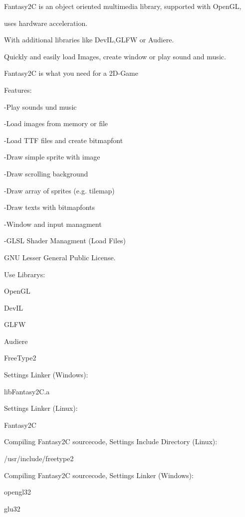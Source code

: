  Fantasy2C is an object oriented multimedia library, supported with OpenGL, \par
 uses hardware acceleration. \par
 With additional libraries like DevIL,GLFW or Audiere. \par
 Quickly and easily load Images, create window or play sound and music. \par
 Fantasy2C is what you need for a 2D-\/Game \par
 \par
 Features: \par
 -\/Play sounds und music\par
 -\/Load images from memory or file\par
 -\/Load TTF files and create bitmapfont\par
 -\/Draw simple sprite with image\par
 -\/Draw scrolling background\par
 -\/Draw array of sprites (e.g. tilemap)\par
 -\/Draw texts with bitmapfonts\par
 -\/Window and input managment\par
 -\/GLSL Shader Managment (Load Files)\par
 \par
 GNU Lesser General Public License. \par
 \par
 Use Librarys: \par
 OpenGL \par
 DevIL \par
 GLFW \par
 Audiere \par
 FreeType2 \par
 \par
 Settings Linker (Windows): \par
 libFantasy2C.a \par
 \par
 Settings Linker (Linux): \par
 Fantasy2C \par
 \par
 Compiling Fantasy2C sourcecode, Settings Include Directory (Linux): \par
 /usr/include/freetype2 \par
 \par
 Compiling Fantasy2C sourcecode, Settings Linker (Windows): \par
 opengl32 \par
 glu32 \par
